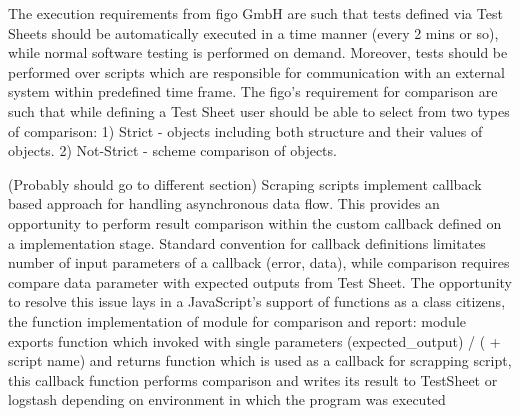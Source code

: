 	
	The execution requirements from figo GmbH are such that tests defined via Test Sheets should be automatically executed in a time manner (every 2 mins or so), while normal software testing is performed on demand. Moreover, tests should be performed over scripts which are responsible for communication with an external system within predefined time frame.
	The figo's requirement for comparison are such that while defining a Test Sheet user should be able to select from two types of comparison: 1) Strict -  objects including both structure and their values of objects. 2) Not-Strict - scheme comparison of objects.
	
	(Probably should go to different section)
	Scraping scripts implement callback based approach for handling asynchronous data flow. This provides an opportunity to perform result comparison within the custom callback defined on a implementation stage.
	Standard convention for callback definitions limitates number of input parameters of a callback (error, data), while comparison requires compare data parameter with expected outputs from Test Sheet. The opportunity to resolve this issue lays in a JavaScript's support of functions as a class citizens, the function implementation of module for comparison and report: module exports function which invoked with single parameters (expected\_output) / ( + script name) and returns function which is used as a callback for scrapping script, this callback function performs comparison and writes its result to TestSheet or logstash depending on environment in which the program was executed
	
	
	
